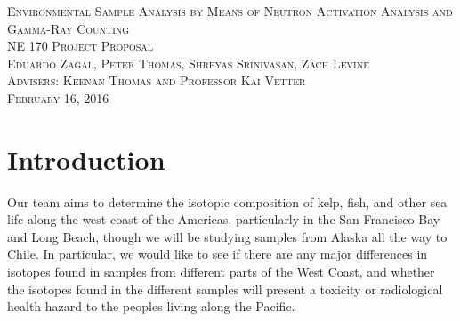 \documentclass[]{article}
\begin{document}
\doublespacing
{}

\begin{titlepage}
\null{}
\begin{center}
\textsc{\LARGE Environmental Sample Analysis by Means of Neutron Activation Analysis and Gamma-Ray Counting
}\\[1.5cm]

\textsc{\Large NE 170 Project Proposal}\\[0.5cm]
\textsc{\Large Eduardo Zagal, Peter Thomas, Shreyas Srinivasan, Zach Levine}\\[0.5cm] %
\textsc{\Large Advisers: Keenan Thomas and Professor Kai Vetter}\\[0.5cm]
\textsc{\Large February 16, 2016}\\[0.5cm] %
\end{center}
\end{titlepage}
\pagebreak


\tableofcontents

\pagebreak


\singlespacing

\section{Introduction}
Our team aims to determine the isotopic composition of kelp, fish, and other sea life along the west coast of the Americas, particularly in the San Francisco Bay and Long Beach, though we will be studying samples from Alaska all the way to Chile. In particular, we would like to see if there are any major differences in isotopes found in samples from different parts of the West Coast, and whether the isotopes found in the different samples will present a toxicity or radiological health hazard to the peoples living along the Pacific.
\end{document}
